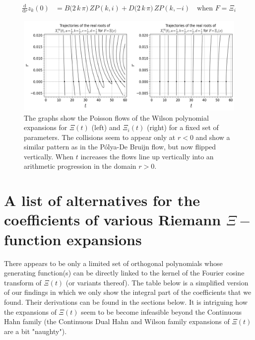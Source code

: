 \documentclass[a4paper,11pt,twoside]{amsart}
\begin{document}
\begin{small}
{\begin{minipage}{\textwidth}
\begin{align}
  \frac{\mathrm{d}}{\mathrm{d} r} z_k(0)&= B\big(2\,k\,\pi\big)\,ZP(k,i)+D\big(2\,k\,\pi)\,ZP(k,-i)\quad \text{when } F=\Xi_i 
\end{align}
\end{minipage}}
\begin{figure}[H]
  \includegraphics[width=1\linewidth]{WilsonFlowdouble.jpeg}
  \caption{The graphs show the Poisson flows of the Wilson polynomial expansions for $\Xi(t)$ (left) and $\Xi_i(t)$ (right) for a fixed set of parameters. The collisions seem to appear only at $r < 0$ and show a similar pattern as in the Pólya-De Bruijn flow, but now flipped vertically. When $t$ increases the flows line up vertically into an arithmetic progression in the domain $r > 0$.}
  \label{fig:flowW2}
\end{figure}
\end{small}
\pagebreak

\renewcommand{\theequation}{B.\arabic{equation}}
\setcounter{equation}{0}
\section{A list of alternatives for the coefficients of various Riemann $\Xi-$function expansions}\label{specexpansions}

There appears to be only a limited set of orthogonal polynomials whose generating function(s) can be directly linked to the kernel of the Fourier cosine transform of $\Xi(t)$ (or variants thereof). The table below is a simplified version of our findings in which we only show the integral part of the coefficients that we found. Their derivations can be found in the sections below. It is intriguing how the expansions of $\Xi(t)$ seem to be become infeasible beyond the Continuous Hahn family (the Continuous Dual Hahn and Wilson family expansions of $\Xi(t)$ are a bit "naughty"). 
\end{document}

